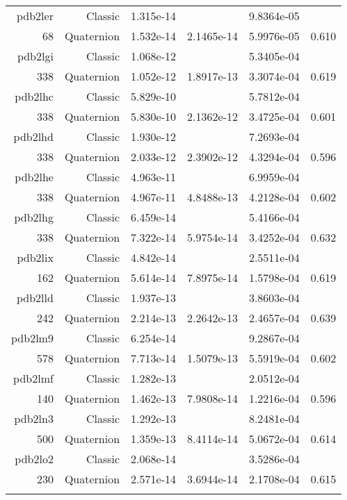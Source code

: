 \begin{xltabular}{\textwidth}{r|rS[table-format=1.3e+2]S[table-format=1.4e+2]S[table-format=1.4e+2]S[table-format=-1.3]}
pdb2ler & Classic & 1.315e-14 &  & 9.8364e-05 & \\
68 & Quaternion & 1.532e-14 & 2.1465e-14 & 5.9976e-05 & 0.610\\  \addlinespace
pdb2lgi & Classic & 1.068e-12 &  & 5.3405e-04 & \\
338 & Quaternion & 1.052e-12 & 1.8917e-13 & 3.3074e-04 & 0.619\\  \addlinespace
pdb2lhc & Classic & 5.829e-10 &  & 5.7812e-04 & \\
338 & Quaternion & 5.830e-10 & 2.1362e-12 & 3.4725e-04 & 0.601\\  \addlinespace
pdb2lhd & Classic & 1.930e-12 &  & 7.2693e-04 & \\
338 & Quaternion & 2.033e-12 & 2.3902e-12 & 4.3294e-04 & 0.596\\  \addlinespace
pdb2lhe & Classic & 4.963e-11 &  & 6.9959e-04 & \\
338 & Quaternion & 4.967e-11 & 4.8488e-13 & 4.2128e-04 & 0.602\\  \addlinespace
pdb2lhg & Classic & 6.459e-14 &  & 5.4166e-04 & \\
338 & Quaternion & 7.322e-14 & 5.9754e-14 & 3.4252e-04 & 0.632\\  \addlinespace
pdb2lix & Classic & 4.842e-14 &  & 2.5511e-04 & \\
162 & Quaternion & 5.614e-14 & 7.8975e-14 & 1.5798e-04 & 0.619\\  \addlinespace
pdb2lld & Classic & 1.937e-13 &  & 3.8603e-04 & \\
242 & Quaternion & 2.214e-13 & 2.2642e-13 & 2.4657e-04 & 0.639\\  \addlinespace
pdb2lm9 & Classic & 6.254e-14 &  & 9.2867e-04 & \\
578 & Quaternion & 7.713e-14 & 1.5079e-13 & 5.5919e-04 & 0.602\\  \addlinespace
pdb2lmf & Classic & 1.282e-13 &  & 2.0512e-04 & \\
140 & Quaternion & 1.462e-13 & 7.9808e-14 & 1.2216e-04 & 0.596\\  \addlinespace
pdb2ln3 & Classic & 1.292e-13 &  & 8.2481e-04 & \\
500 & Quaternion & 1.359e-13 & 8.4114e-14 & 5.0672e-04 & 0.614\\  \addlinespace
pdb2lo2 & Classic & 2.068e-14 &  & 3.5286e-04 & \\
230 & Quaternion & 2.571e-14 & 3.6944e-14 & 2.1708e-04 & 0.615\\  \addlinespace

\end{xltabular}
